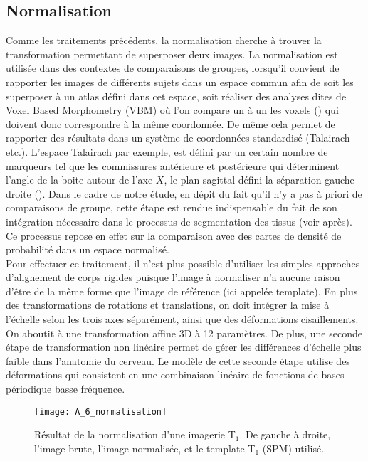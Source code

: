 \subsection{Normalisation}
Comme les traitements précédents, la normalisation cherche à trouver la transformation
permettant de superposer deux images. La normalisation est utilisée dans des contextes de
comparaisons de groupes, lorsqu’il convient de rapporter les images de différents sujets dans un
espace commun afin de soit les superposer à un atlas défini dans cet espace, soit réaliser des analyses
dites de Voxel Based Morphometry (VBM) où l’on compare un à un les voxels (\cite{Mechelli2005}) qui doivent donc
correspondre à la même coordonnée. De même cela permet de rapporter des résultats dans un
système de coordonnées standardisé (Talairach etc.). L’espace Talairach par exemple, est défini par un
certain nombre de marqueurs tel que les commissures antérieure et postérieure qui déterminent
l’angle de la boite autour de l’axe $X$, le plan sagittal défini la séparation gauche droite (\cite{Talairach1988}). Dans le cadre de notre étude, en dépit du fait qu’il n’y a pas à priori de comparaisons de groupe, cette étape
est rendue indispensable du fait de son intégration nécessaire dans le processus de segmentation des
tissus (voir après). Ce processus repose en effet sur la comparaison avec des cartes de densité de
probabilité dans un espace normalisé.\\
Pour effectuer ce traitement, il n’est plus possible d’utiliser les simples approches
d’alignement de corps rigides puisque l’image à normaliser n’a aucune raison d’être de la même forme
que l’image de référence (ici appelée template). En plus des transformations de rotations et
translations, on doit intégrer la mise à l’échelle selon les trois axes séparément, ainsi que des
déformations cisaillements. On aboutit à une transformation affine 3D à 12 paramètres. De plus, une
seconde étape de transformation non linéaire permet de gérer les différences d’échelle plus faible
dans l’anatomie du cerveau. Le modèle de cette seconde étape utilise des déformations qui consistent
en une combinaison linéaire de fonctions de bases périodique basse fréquence.\\
\begin{figure}[!t]
\centering
\texttt{[image: A\_6\_normalisation]}
\caption{Résultat de la normalisation d'une imagerie T$_1$. De gauche à droite, l'image brute, l'image normalisée, et le
template T$_1$ (SPM) utilisé.}
\label{fig:A_6_normalisation}	
\end{figure}
